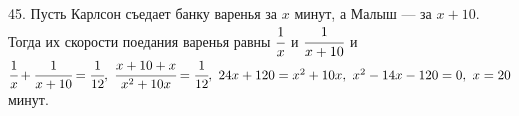 45. Пусть Карлсон съедает банку варенья за $x$ минут, а Малыш --- за $x+10.$ Тогда их скорости поедания варенья равны $\cfrac{1}{x}$ и $\cfrac{1}{x+10}$ и $\cfrac{1}{x}+\cfrac{1}{x+10}=\cfrac{1}{12},\ \cfrac{x+10+x}{x^2+10x}=\cfrac{1}{12},\ 24x+120=x^2+10x,\ x^2-14x-120=0,\ x=20$ минут.\\
